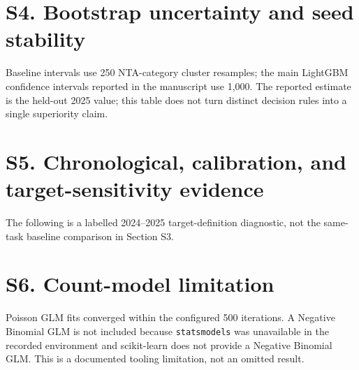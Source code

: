 \documentclass[10pt]{article}
\begin{document}
\section*{S4. Bootstrap uncertainty and seed stability}
Baseline intervals use 250 NTA-category cluster resamples; the main LightGBM confidence intervals reported in the manuscript use 1,000. The reported estimate is the held-out 2025 value; this table does not turn distinct decision rules into a single superiority claim.
\begin{table}[H]
\centering\scriptsize

\caption{Cluster-bootstrap uncertainty for final-comparison rows.}\label{tab:supp-bootstrap}
\end{table}
\begin{table}[H]
\centering\small

\caption{Five-seed held-out stability for key ablation configurations. Values are mean $\pm$ standard deviation.}\label{tab:supp-seeds}
\end{table}
\clearpage

\section*{S5. Chronological, calibration, and target-sensitivity evidence}
\begin{table}[H]
\centering\small

\caption{Expanding-window rolling-origin test metrics for T2.}\label{tab:supp-rolling}
\end{table}
\begin{table}[H]
\centering\small

\caption{Final-style 2025 calibration diagnostics for T2.}\label{tab:supp-calibration}
\end{table}
\noindent The following is a labelled 2024--2025 target-definition diagnostic, not the same-task baseline comparison in Section S3.
\begin{table}[H]
\centering\small

\caption{Target-sensitivity diagnostic with prevalence and ranking metrics.}\label{tab:supp-targets}
\end{table}

\section*{S6. Count-model limitation}
Poisson GLM fits converged within the configured 500 iterations. A Negative Binomial GLM is not included because \texttt{statsmodels} was unavailable in the recorded environment and scikit-learn does not provide a Negative Binomial GLM. This is a documented tooling limitation, not an omitted result.
\end{document}
